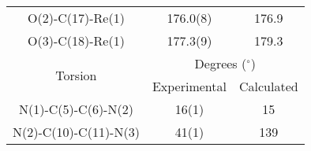 \begin{table}[htb]
\begin{tabular}{ccc}
    O(2)-C(17)-Re(1) & 176.0(8) & 176.9 \\ 
    O(3)-C(18)-Re(1) & 177.3(9) & 179.3 \\ \midrule
    \multirow{2}{*}{Torsion} & \multicolumn{2}{c}{Degrees ($^\circ$)} \\ \cline{2-3}
     & Experimental & Calculated \\ \midrule
    N(1)-C(5)-C(6)-N(2) &  16(1) & 15\\
    N(2)-C(10)-C(11)-N(3) & 41(1) & 139\\
    \bottomrule
    \end{tabular}%
  \label{tab.da1}%
\end{table}%


